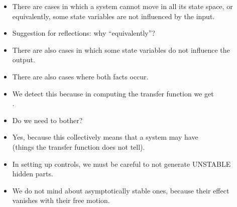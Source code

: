\begin{frame}
\myPause
 \begin{itemize}[<+-| alert@+>]
 \item There are cases in which a system cannot move in all its state space, or equivalently,
       some state variables are not influenced by the input.
 \item Suggestion for reflections: why ``equivalently''?
 \item There are also cases in which some state variables do not influence the output.
 \item There are also cases where both facts occur.
 \item We detect this because in computing the transfer function we get\\
       .
 \end{itemize}
\end{frame}

\begin{frame}
\myPause
 \begin{itemize}[<+-| alert@+>]
 \item Do we need to bother?
 \item Yes, because this collectively means that a system may have \\
       (things the transfer function does not tell).
 \item In setting up controls, we must be careful to not generate UNSTABLE hidden parts.
 \item We do not mind about asymptotically stable ones, because their effect\\
       vanishes with their free motion.
 \end{itemize}
\end{frame}



